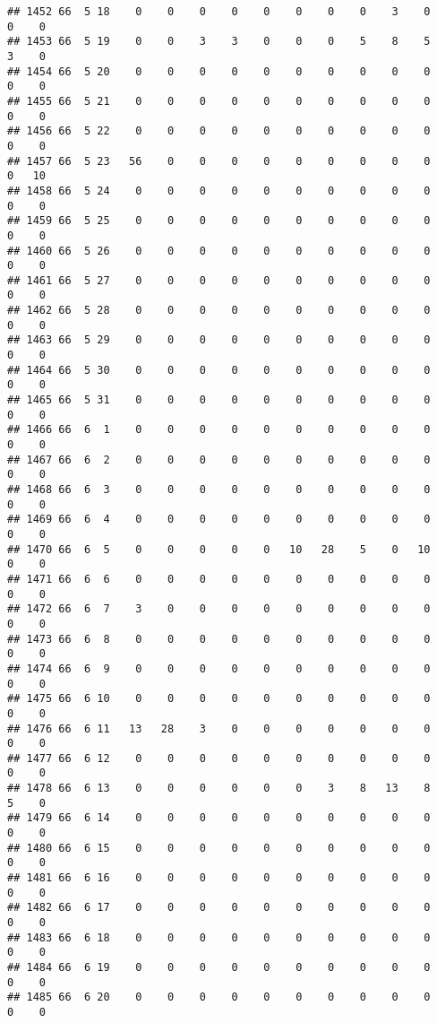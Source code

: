 \documentclass[]{article}
\begin{document}
\begin{verbatim}
## 1452 66  5 18    0    0    0    0    0    0    0    0    3    0    0    0
## 1453 66  5 19    0    0    3    3    0    0    0    5    8    5    3    0
## 1454 66  5 20    0    0    0    0    0    0    0    0    0    0    0    0
## 1455 66  5 21    0    0    0    0    0    0    0    0    0    0    0    0
## 1456 66  5 22    0    0    0    0    0    0    0    0    0    0    0    0
## 1457 66  5 23   56    0    0    0    0    0    0    0    0    0    0   10
## 1458 66  5 24    0    0    0    0    0    0    0    0    0    0    0    0
## 1459 66  5 25    0    0    0    0    0    0    0    0    0    0    0    0
## 1460 66  5 26    0    0    0    0    0    0    0    0    0    0    0    0
## 1461 66  5 27    0    0    0    0    0    0    0    0    0    0    0    0
## 1462 66  5 28    0    0    0    0    0    0    0    0    0    0    0    0
## 1463 66  5 29    0    0    0    0    0    0    0    0    0    0    0    0
## 1464 66  5 30    0    0    0    0    0    0    0    0    0    0    0    0
## 1465 66  5 31    0    0    0    0    0    0    0    0    0    0    0    0
## 1466 66  6  1    0    0    0    0    0    0    0    0    0    0    0    0
## 1467 66  6  2    0    0    0    0    0    0    0    0    0    0    0    0
## 1468 66  6  3    0    0    0    0    0    0    0    0    0    0    0    0
## 1469 66  6  4    0    0    0    0    0    0    0    0    0    0    0    0
## 1470 66  6  5    0    0    0    0    0   10   28    5    0   10    0    0
## 1471 66  6  6    0    0    0    0    0    0    0    0    0    0    0    0
## 1472 66  6  7    3    0    0    0    0    0    0    0    0    0    0    0
## 1473 66  6  8    0    0    0    0    0    0    0    0    0    0    0    0
## 1474 66  6  9    0    0    0    0    0    0    0    0    0    0    0    0
## 1475 66  6 10    0    0    0    0    0    0    0    0    0    0    0    0
## 1476 66  6 11   13   28    3    0    0    0    0    0    0    0    0    0
## 1477 66  6 12    0    0    0    0    0    0    0    0    0    0    0    0
## 1478 66  6 13    0    0    0    0    0    0    3    8   13    8    5    0
## 1479 66  6 14    0    0    0    0    0    0    0    0    0    0    0    0
## 1480 66  6 15    0    0    0    0    0    0    0    0    0    0    0    0
## 1481 66  6 16    0    0    0    0    0    0    0    0    0    0    0    0
## 1482 66  6 17    0    0    0    0    0    0    0    0    0    0    0    0
## 1483 66  6 18    0    0    0    0    0    0    0    0    0    0    0    0
## 1484 66  6 19    0    0    0    0    0    0    0    0    0    0    0    0
## 1485 66  6 20    0    0    0    0    0    0    0    0    0    0    0    0

\end{verbatim}
\end{document}
